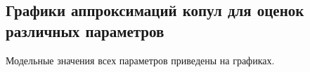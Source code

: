 \begin{appendices}
\chapter{Графики аппроксимаций копул для оценок различных параметров}\label{app:appendix}
Модельные значения всех параметров приведены на графиках.

\begin{figure}[H]
	{}
\end{figure}

\begin{figure}[H]
	{}
\end{figure}

\begin{figure}[H]
	{}
\end{figure}

\begin{figure}[H]
	{}
\end{figure}

\begin{figure}[H]
	{}
\end{figure}

\begin{figure}[H]
	{}
\end{figure}

\begin{figure}[H]
	{}
\end{figure}

\begin{figure}[H]
	{}
\end{figure}

\begin{figure}[H]
	{}
\end{figure}

\begin{figure}[H]
	{}
\end{figure}

\end{appendices}
